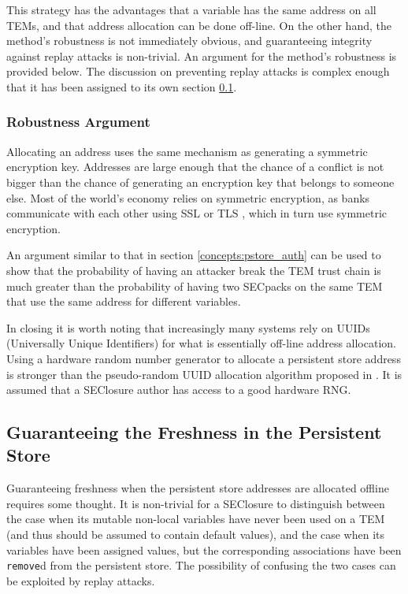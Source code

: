 This strategy has the advantages that a variable has the same address on all
TEMs, and that address allocation can be done off-line. On the other hand, the
method's robustness is not immediately obvious, and guaranteeing integrity
against replay attacks is non-trivial. An argument for the method's robustness
is provided below. The discussion on preventing replay attacks is complex
enough that it has been assigned to its own section \ref{arch:pstore_freshness}.

\subsubsection{Robustness Argument}
Allocating an address uses the same mechanism as generating a symmetric
encryption key. Addresses are large enough that the chance of a conflict is not
bigger than the chance of generating an encryption key that belongs to someone
else. Most of the world's economy relies on symmetric encryption, as banks
communicate with each other using SSL \cite{freier1996ssl} or TLS
\cite{dierks1999tpv}, which in turn use symmetric encryption.

An argument similar to that in section \ref{concepts:pstore_auth} can be
used to show that the probability of having an attacker break the TEM trust
chain is much greater than the probability of having two SECpacks on the same
TEM that use the same address for different variables.

In closing it is worth noting that increasingly many systems rely on UUIDs
(Universally Unique Identifiers) \cite{leach2005ruu} for what is
essentially off-line address allocation. Using a hardware random number
generator to allocate a persistent store address is stronger than
the pseudo-random UUID allocation algorithm proposed in \cite{leach2005ruu}.
It is assumed that a SEClosure author has access to a good hardware RNG.

\subsection{Guaranteeing the Freshness in the Persistent
Store}\label{arch:pstore_freshness}
Guaranteeing freshness when the persistent store addresses are allocated 
offline requires some thought. It is non-trivial for a SEClosure to distinguish
between the case when its mutable non-local variables have never been used on a
TEM (and thus should be assumed to contain default values), and the case when
its variables have been assigned values, but the corresponding associations
have been \texttt{remove}d from the persistent store. The possibility of
confusing the two cases can be exploited by replay attacks.

